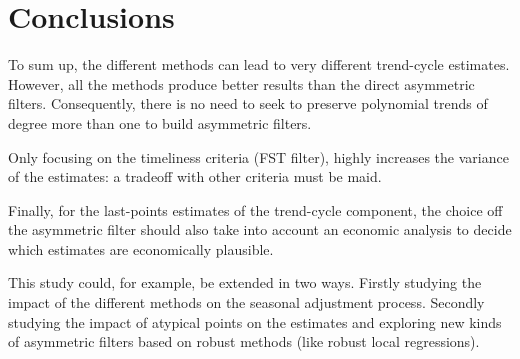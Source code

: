 \documentclass[
  12pt,
  ,
  a4paper]{article}
\begin{document}
\hypertarget{conclusions}{%
\section{Conclusions}\label{conclusions}}

To sum up, the different methods can lead to very different trend-cycle estimates.
However, all the methods produce better results than the direct asymmetric filters.
Consequently, there is no need to seek to preserve polynomial trends of degree more than one to build asymmetric filters.

Only focusing on the timeliness criteria (FST filter), highly increases the variance of the estimates: a tradeoff with other criteria must be maid.

Finally, for the last-points estimates of the trend-cycle component, the choice off the asymmetric filter should also take into account an economic analysis to decide which estimates are economically plausible.

This study could, for example, be extended in two ways.
Firstly studying the impact of the different methods on the seasonal adjustment process.
Secondly studying the impact of atypical points on the estimates and exploring new kinds of asymmetric filters based on robust methods (like robust local regressions).

\renewcommand\refname{References}
  
\end{document}
